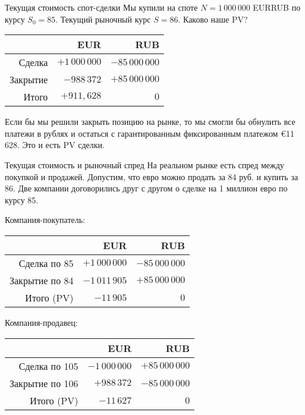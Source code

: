 \documentclass{beamer}
\renewcommand{\EUR}[1]{\textup{\euro}#1}
\begin{document}
\begin{frame}{Текущая стоимость спот-сделки}
\justify
Мы купили на споте $N=1\,000\,000$ EURRUB по курсу $S_0 = 85$. Текущий рыночный курс $S=86$. Каково наше PV?

\justify
\centering
\begin{tabular}{r|r|r}
         & EUR               & RUB \\ \hline
Сделка   & $+1\,000\,000$ & $-85\,000\,000$ \\
Закрытие &    $-988\,372$ & $+85\,000\,000$ \\ \hline
Итого    &      $+911,628$ & $0$
\end{tabular}

\justify
Если бы мы решили закрыть позицию на рынке, то мы смогли бы обнулить все платежи в рублях и остаться с гарантированным фиксированным платежом \EUR{11\,628}. Это и есть PV сделки.
\end{frame}



\begin{frame}{Текущая стоимость и рыночный спред}
\justify
На реальном рынке есть спред между покупкой и продажей. Допустим, что евро можно продать за 84 руб. и купить за 86. Две компании договорились друг с другом о сделке на 1 миллион евро по курсу 85.

\justify
Компания-покупатель:

\centering
\begin{tabular}{r|r|r}
                & EUR                   & RUB \\ \hline
Сделка по 85   & $+1\,000\,000$ & $-85\,000\,000$ \\
Закрытие по 84 & $-1\,011\,905$ & $+85\,000\,000$ \\ \hline
Итого (PV)      &      $-11\,905$ & $0$
\end{tabular}

\justify
Компания-продавец:

\centering
\begin{tabular}{r|r|r}
                 & EUR                   & RUB \\ \hline
Сделка по 105    & $-1\,000\,000$ & $+85\,000\,000$ \\
Закрытие по 106  &    $+988\,372$ & $-85\,000\,000$ \\ \hline
Итого (PV)       &      $-11\,627$ & $0$
\end{tabular} 
\end{frame}
\end{document}
